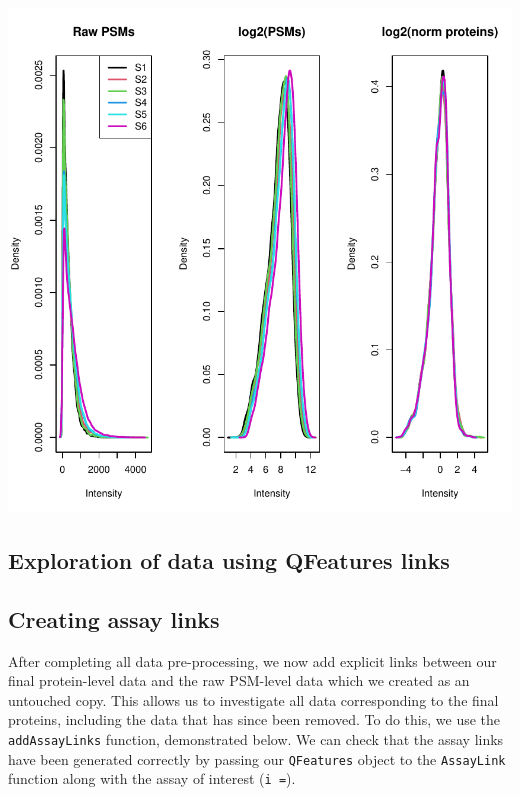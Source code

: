 \documentclass[9pt,a4paper,]{extarticle}
\begin{document}
\begin{center}\includegraphics[width=0.9\linewidth]{workflow_expressions_files/figure-latex/tmt_transformations-1} \end{center}

\hypertarget{exploration-of-data-using-qfeatures-links}{%
\subsection{Exploration of data using QFeatures links}\label{exploration-of-data-using-qfeatures-links}}

\hypertarget{creating-assay-links}{%
\subsection{Creating assay links}\label{creating-assay-links}}

After completing all data pre-processing, we now add explicit links between our
final protein-level data and the raw PSM-level data which we created as an
untouched copy. This allows us to investigate all data corresponding to the
final proteins, including the data that has since been removed. To do this, we
use the \texttt{addAssayLinks} function, demonstrated below. We can check that the
assay links have been generated correctly by passing our \texttt{QFeatures} object to
the \texttt{AssayLink} function along with the assay of interest (\texttt{i\ =}).
\end{document}
